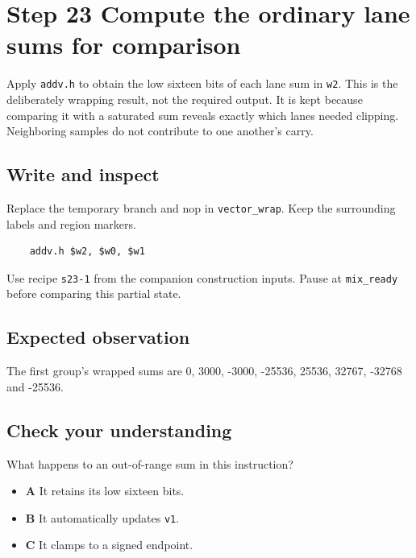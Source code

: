 \section{Step 23 Compute the ordinary lane sums for comparison}\label{pcm-s23}

Apply \texttt{addv.h} to obtain the low sixteen bits of each lane sum in \texttt{w2}. This is the deliberately wrapping result, not the required output. It is kept because comparing it with a saturated sum reveals exactly which lanes needed clipping. Neighboring samples do not contribute to one another’s carry.

\subsection{Write and inspect}
Replace the temporary branch and nop in \texttt{vector\_wrap}. Keep the surrounding labels and region markers.

\begin{verbatim}
    addv.h $w2, $w0, $w1
\end{verbatim}
Use recipe \texttt{s23-1} from the companion construction inputs. Pause at \texttt{mix\_ready} before comparing this partial state.

\subsection{Expected observation}
The first group’s wrapped sums are 0, 3000, -3000, -25536, 25536, 32767, -32768 and -25536.

\subsection{Check your understanding}
What happens to an out-of-range sum in this instruction?

\begin{itemize}
\item \textbf{A} It retains its low sixteen bits.
\item \textbf{B} It automatically updates \texttt{v1}.
\item \textbf{C} It clamps to a signed endpoint.
\end{itemize}
